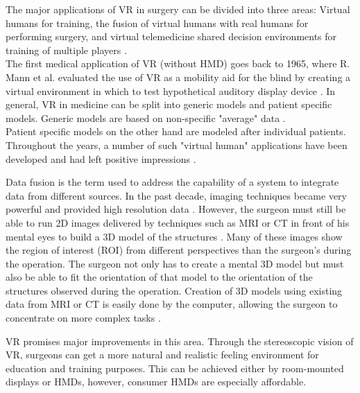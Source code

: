The major applications of VR in surgery can be divided into three areas:
Virtual humans for training, the fusion of virtual humans with real humans for performing surgery, 
and virtual telemedicine shared decision environments for training of multiple players \cite{486713}.
\\
The first medical application of VR (without HMD) goes back to 1965, where R. Mann et al. evaluated the use of VR as a mobility aid for the blind by creating a virtual environment in which to test hypothetical auditory display device \cite{mann1965evaluation}.
In general, VR in medicine can be split into generic models and patient specific models.
Generic models are based on non-specific "average" data \cite{486713}.
\\
Patient specific models on the other hand are modeled after individual patients.
Throughout the years, a number of such "virtual human" applications have been developed and had left positive impressions \cite{486713}.

Data fusion is the term used to address the capability of a system to integrate data from different sources.
In the past decade, imaging techniques became very powerful and provided high resolution data \cite{RN2}.
However, the surgeon must still be able to run 2D images delivered by techniques such as MRI or CT in front of his mental eyes to build a 3D model of the structures \cite{Fonseca.2018}.
Many of these images show the region of interest (ROI) from different perspectives than the surgeon’s during the operation.
The surgeon not only has to create a mental 3D model but must also be able to fit the orientation of that model to the orientation of the structures observed during the operation.
Creation of 3D models using existing data from MRI or CT is easily done by the computer, allowing the surgeon to concentrate on more complex tasks \cite{486713}.

VR promises major improvements in this area.
Through the stereoscopic vision of VR, surgeons can get a more natural and realistic feeling environment for education and training purposes.
This can be achieved either by room-mounted displays or HMDs, however, consumer HMDs are especially affordable.





